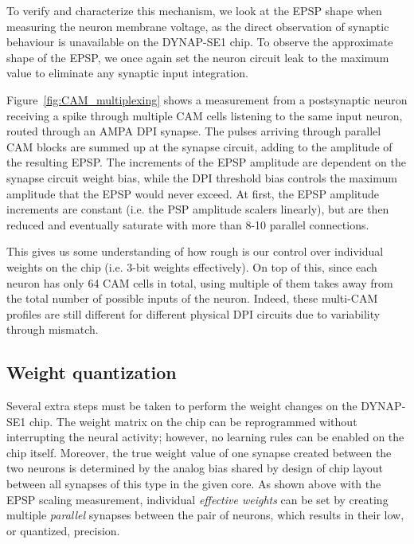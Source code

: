 To verify and characterize this mechanism, we look at the EPSP shape when measuring the neuron membrane voltage, as the direct observation of synaptic behaviour is unavailable on the DYNAP-SE1 chip. To observe the approximate shape of the EPSP, we once again set the neuron circuit leak to the maximum value to eliminate any synaptic input integration. 


Figure~\ref{fig:CAM_multiplexing} shows a measurement from a postsynaptic neuron receiving a spike through multiple CAM cells listening to the same input neuron, routed through an AMPA DPI synapse. The pulses arriving through parallel CAM blocks are summed up at the synapse circuit, adding to the amplitude of the resulting EPSP. The increments of the EPSP amplitude are dependent on the synapse circuit weight bias, while the DPI threshold bias controls the maximum amplitude that the EPSP would never exceed. At first, the EPSP amplitude increments are constant (i.e. the PSP amplitude scalers linearly), but are then reduced and eventually saturate with more than 8-10 parallel connections.


This gives us some understanding of how rough is our control over individual weights on the chip (i.e. 3-bit weights effectively). On top of this, since each neuron has only 64 CAM cells in total, using multiple of them takes away from the total number of possible inputs of the neuron. Indeed, these multi-CAM profiles are still different for different physical DPI circuits due to variability through mismatch.





\subsection{Weight quantization}

Several extra steps must be taken to perform the weight changes on the DYNAP-SE1 chip. The weight matrix on the chip can be reprogrammed without interrupting the neural activity; however, no learning rules can be enabled on the chip itself. Moreover, the true weight value of one synapse created between the two neurons is determined by the analog bias shared by design of chip layout between all synapses of this type in the given core. As shown above with the EPSP scaling measurement, individual \textit{effective weights} can be set by creating multiple \textit{parallel} synapses between the pair of neurons, which results in their low, or quantized, precision.\\

